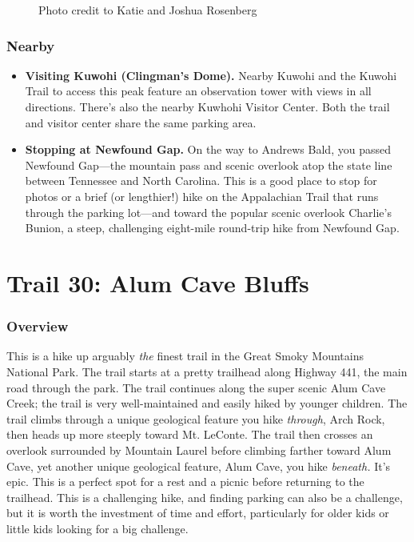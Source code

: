 \documentclass[
  letterpaper,
  DIV=11,
  numbers=noendperiod]{scrreprt}
\makeatletter
\providecommand{\tightlist}{%
  \setlength{\itemsep}{0pt}\setlength{\parskip}{0pt}}\usepackage{longtable,booktabs,array}
\newcommand*\pandocbounded[1]{%
  \sbox\pandoc@box{#1}%
  \Gscale@div\@tempa{\textheight}{\dimexpr\ht\pandoc@box+\dp\pandoc@box\relax}%
  \Gscale@div\@tempb{\linewidth}{\wd\pandoc@box}%
  \ifdim\@tempb\p@<\@tempa\p@\let\@tempa\@tempb\fi%
  \ifdim\@tempa\p@<\p@\scalebox{\@tempa}{\usebox\pandoc@box}%
  \else\usebox{\pandoc@box}%
  \fi%
}
\makeatother
\begin{document}
\begin{figure}[H]

{\centering \pandocbounded{\texttt{[image: img/trail-29-figure-02.jpg]}}

}

\caption{Photo credit to Katie and Joshua Rosenberg}

\end{figure}%

\subsection{Nearby}\label{nearby-28}

\begin{itemize}
\tightlist
\item
  \textbf{Visiting Kuwohi (Clingman's Dome).} Nearby Kuwohi and the
  Kuwohi Trail to access this peak feature an observation tower with
  views in all directions. There's also the nearby Kuwhohi Visitor
  Center. Both the trail and visitor center share the same parking area.
\item
  \textbf{Stopping at Newfound Gap.} On the way to Andrews Bald, you
  passed Newfound Gap---the mountain pass and scenic overlook atop the
  state line between Tennessee and North Carolina. This is a good place
  to stop for photos or a brief (or lengthier!) hike on the Appalachian
  Trail that runs through the parking lot---and toward the popular
  scenic overlook Charlie's Bunion, a steep, challenging eight-mile
  round-trip hike from Newfound Gap.
\end{itemize}

\chapter{Trail 30: Alum Cave Bluffs}\label{trail-30-alum-cave-bluffs}

\subsection{Overview}\label{overview-30}

This is a hike up arguably \emph{the} finest trail in the Great Smoky
Mountains National Park. The trail starts at a pretty trailhead along
Highway 441, the main road through the park. The trail continues along
the super scenic Alum Cave Creek; the trail is very well-maintained and
easily hiked by younger children. The trail climbs through a unique
geological feature you hike \emph{through}, Arch Rock, then heads up
more steeply toward Mt. LeConte. The trail then crosses an overlook
surrounded by Mountain Laurel before climbing farther toward Alum Cave,
yet another unique geological feature, Alum Cave, you hike
\emph{beneath.} It's epic. This is a perfect spot for a rest and a
picnic before returning to the trailhead. This is a challenging hike,
and finding parking can also be a challenge, but it is worth the
investment of time and effort, particularly for older kids or little
kids looking for a big challenge.
\end{document}
